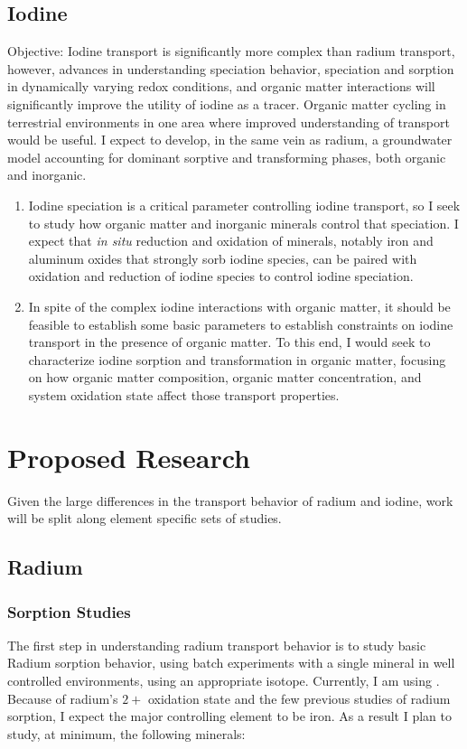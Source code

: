 \documentclass[twoside,12pt,titlepage]{article}
\newcommand{\isotope}[2]{\ch{^{#1}#2}}
\begin{document}
\subsection{Iodine}

Objective: Iodine transport is significantly more complex than radium transport, however, advances in understanding speciation behavior, speciation and sorption in dynamically varying redox conditions, and organic matter interactions will significantly improve the utility of iodine as a tracer. Organic matter cycling in terrestrial environments in one area where improved understanding of transport would be useful. I expect to develop, in the same vein as radium, a groundwater model accounting for dominant sorptive and transforming phases, both organic and inorganic.

\begin{enumerate}[label = \arabic*)]
	\item Iodine speciation is a critical parameter controlling iodine transport, so I seek to study how organic matter and inorganic minerals control that speciation. I expect that \textit{in situ} reduction and oxidation of minerals, notably iron and aluminum oxides that strongly sorb iodine species, can be paired with oxidation and reduction of iodine species to control iodine speciation.
	\item In spite of the complex iodine interactions with organic matter, it should be feasible to establish some basic parameters to establish constraints on iodine transport in the presence of organic matter. To this end, I would seek to characterize iodine sorption and transformation in organic matter, focusing on how organic matter composition, organic matter concentration, and system oxidation state affect those transport properties.

\end{enumerate}

\section{Proposed Research}

Given the large differences in the transport behavior of radium and iodine, work will be split along element specific sets of studies.

\subsection{Radium}

\subsubsection{Sorption Studies}
The first step in understanding radium transport behavior is to study basic Radium sorption behavior, using batch experiments with a single mineral in well controlled environments, using an appropriate isotope. Currently, I am using \isotope{226}{Ra}. Because of radium's $2+$ oxidation state and the few previous studies of radium sorption, I expect the major controlling element to be iron. As a result I plan to study, at minimum, the following minerals:
\end{document}

